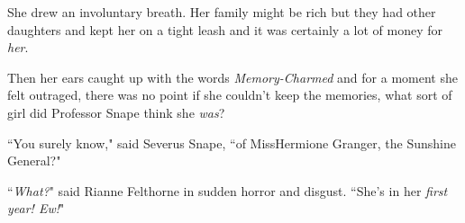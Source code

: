 She drew an involuntary breath. Her family might be rich but they had other daughters and kept her on a tight leash and it was certainly a lot of money for \emph{her}.

Then her ears caught up with the words \emph{Memory-Charmed} and for a moment she felt outraged, there was no point if she couldn't keep the memories, what sort of girl did Professor Snape think she \emph{was}?

``You surely know," said Severus Snape, ``of Miss\?Hermione Granger, the Sunshine General?"

``\emph{What?}" said Rianne Felthorne in sudden horror and disgust. ``She's in her \emph{first year! Ew!}"

